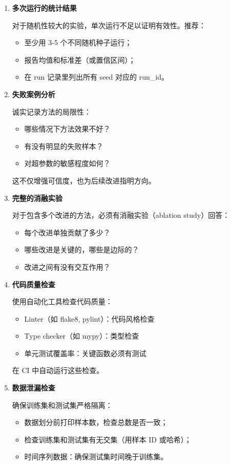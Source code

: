 \begin{enumerate}
  \item \textbf{多次运行的统计结果}

  对于随机性较大的实验，单次运行不足以证明有效性。推荐：
  \begin{itemize}
    \item 至少用 3-5 个不同随机种子运行；
    \item 报告均值和标准差（或置信区间）；
    \item 在 run 记录里列出所有 seed 对应的 run\_id。
  \end{itemize}

  \item \textbf{失败案例分析}

  诚实记录方法的局限性：
  \begin{itemize}
    \item 哪些情况下方法效果不好？
    \item 有没有明显的失败样本？
    \item 对超参数的敏感程度如何？
  \end{itemize}

  这不仅增强可信度，也为后续改进指明方向。

  \item \textbf{完整的消融实验}

  对于包含多个改进的方法，必须有消融实验（ablation study）回答：
  \begin{itemize}
    \item 每个改进单独贡献了多少？
    \item 哪些改进是关键的，哪些是边际的？
    \item 改进之间有没有交互作用？
  \end{itemize}

  \item \textbf{代码质量检查}

  使用自动化工具检查代码质量：
  \begin{itemize}
    \item Linter（如 flake8, pylint）：代码风格检查
    \item Type checker（如 mypy）：类型检查
    \item 单元测试覆盖率：关键函数必须有测试
  \end{itemize}

  在 CI 中自动运行这些检查。

  \item \textbf{数据泄漏检查}

  确保训练集和测试集严格隔离：
  \begin{itemize}
    \item 数据划分前打印样本数，检查总数是否一致；
    \item 检查训练集和测试集有无交集（用样本 ID 或哈希）；
    \item 时间序列数据：确保测试集时间晚于训练集。
  \end{itemize}
\end{enumerate}

